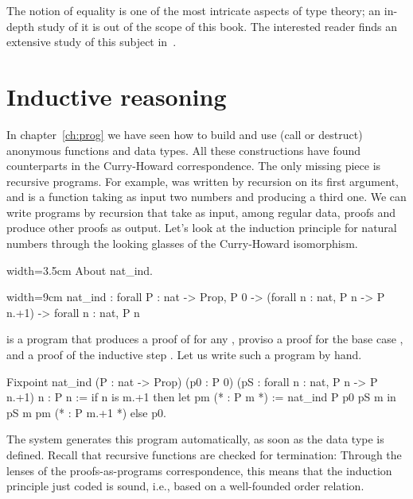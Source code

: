 The notion of equality is one of the most intricate aspects of type
theory; an in-depth study of it is out of the scope of this book.  The interested reader
finds an extensive study of this subject in~\cite{hottbook}.  %


\section{Inductive reasoning}\label{sec:indreason}

In chapter~\ref{ch:prog} we have seen how to build and use (call or destruct)
anonymous functions and data types.  All these
constructions have found counterparts in the Curry-Howard correspondence.
The only missing piece is recursive programs.  For example,
 was written by recursion on its first argument, and is a
function taking as input two numbers and producing a third one.
We can write programs by recursion that take as input, among regular  data,
proofs and produce  other proofs as output.  Let's look at the
induction principle for natural numbers through the looking glasses of the
Curry-Howard isomorphism.

\begin{coq}{}{width=3.5cm}
About nat_ind.
\end{coq}
\begin{coqout}{}{width=9cm}
nat_ind : forall P : nat -> Prop,
  P 0 -> (forall n : nat, P n -> P n.+1) -> forall n : nat, P n
\end{coqout}
 is a program that produces a proof of  for any ,
proviso a proof for the base case , and a proof
of the inductive step .
Let us write such a program by hand.

\begin{coq}{}{}
Fixpoint nat_ind (P : nat -> Prop)
  (p0 : P 0) (pS : forall n : nat, P n -> P n.+1) n : P n :=
  if n is m.+1 then
    let pm (* : P m *) := nat_ind P p0 pS m in
    pS m pm (* : P m.+1 *)
  else p0.
\end{coq}

The \Coq{} system generates this program automatically, as soon as
 the  data type
is defined.  Recall that recursive functions are checked for termination:
Through the lenses of the proofs-as-programs correspondence, this means
that the induction principle just coded is sound, i.e., based on a
well-founded order relation.

